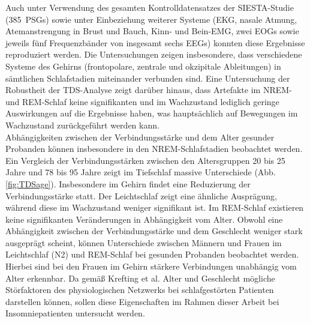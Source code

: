 Auch unter Verwendung des gesamten Kontrolldatensatzes der SIESTA-Studie (385~\acs{PSG}s) sowie unter Einbeziehung weiterer Systeme (\acs{EKG}, nasale Atmung, Atemanstrengung in Brust und Bauch, Kinn- und Bein-\acs{EMG}, zwei \acs{EOG}s sowie jeweils fünf Frequenzbänder von insgesamt sechs \acs{EEG}s) konnten diese Ergebnisse reproduziert werden. Die Untersuchungen zeigen insbesondere, dass verschiedene Systeme des Gehirns (frontopolare, zentrale und okzipitale Ableitungen) in sämtlichen Schlafstadien miteinander verbunden sind. Eine Untersuchung der Robustheit der \acs{TDS}-Analyse zeigt darüber hinaus, dass Artefakte im \acs{NREM}- und \acs{REM}-Schlaf keine signifikanten und im Wachzustand lediglich geringe Auswirkungen auf die Ergebnisse haben, was hauptsächlich auf Bewegungen im Wachzustand zurückgeführt werden kann. \parencite{bartsch_network_2015, breuer_netzwerktopologie_2016}\\

Abhängigkeiten zwischen der Verbindungsstärke und dem Alter gesunder Probanden können insbesondere in den \acs{NREM}-Schlafstadien beobachtet werden. Ein Vergleich der Verbindungsstärken zwischen den Altersgruppen 20 bis 25 Jahre und 78 bis 95 Jahre zeigt im Tiefschlaf massive Unterschiede (Abb. \ref{fig:TDSage}). Insbesondere im Gehirn findet eine Reduzierung der Verbindungsstärke statt. Der Leichtschlaf zeigt eine ähnliche Ausprägung, während diese im Wachzustand weniger signifikant ist. Im \acs{REM}-Schlaf existieren keine signifikanten Veränderungen in Abhängigkeit vom Alter. Obwohl eine Abhängigkeit zwischen der Verbindungsstärke und dem Geschlecht weniger stark ausgeprägt scheint, können Unterschiede zwischen Männern und Frauen im Leichtschlaf (N2) und \acs{REM}-Schlaf bei gesunden Probanden beobachtet werden. Hierbei sind bei den Frauen im Gehirn stärkere Verbindungen unabhängig vom Alter erkennbar. Da gemäß Krefting et al. Alter und Geschlecht mögliche Störfaktoren des physiologischen Netzwerks bei schlafgestörten Patienten darstellen können, sollen diese Eigenschaften im Rahmen dieser Arbeit bei Insomniepatienten untersucht werden. \parencite{krefting_altersabhangigkeit_2016, krefting_age_2017}\\

